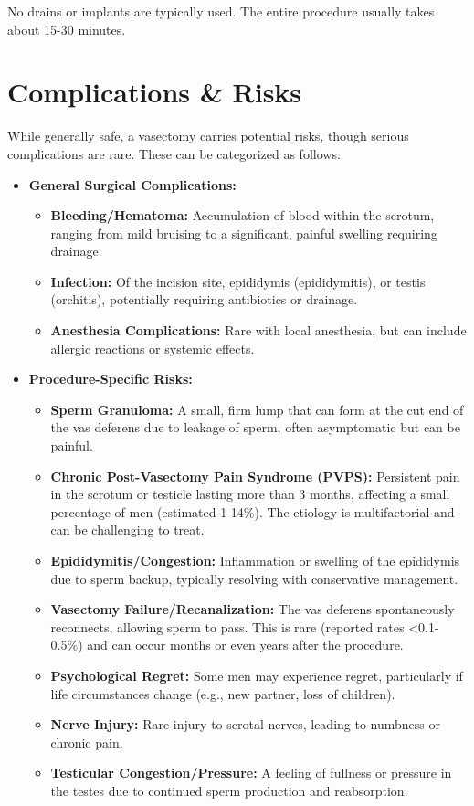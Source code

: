 No drains or implants are typically used. The entire procedure usually takes about 15-30 minutes.

\section*{Complications \& Risks}
While generally safe, a vasectomy carries potential risks, though serious complications are rare. These can be categorized as follows:

\begin{itemize}
  \item \textbf{General Surgical Complications:}
    \begin{itemize}
      \item \textbf{Bleeding/Hematoma:} Accumulation of blood within the scrotum, ranging from mild bruising to a significant, painful swelling requiring drainage.
      \item \textbf{Infection:} Of the incision site, epididymis (epididymitis), or testis (orchitis), potentially requiring antibiotics or drainage.
      \item \textbf{Anesthesia Complications:} Rare with local anesthesia, but can include allergic reactions or systemic effects.
    \end{itemize}
  
  \item \textbf{Procedure-Specific Risks:}
    \begin{itemize}
      \item \textbf{Sperm Granuloma:} A small, firm lump that can form at the cut end of the vas deferens due to leakage of sperm, often asymptomatic but can be painful.
      \item \textbf{Chronic Post-Vasectomy Pain Syndrome (PVPS):} Persistent pain in the scrotum or testicle lasting more than 3 months, affecting a small percentage of men (estimated 1-14\%). The etiology is multifactorial and can be challenging to treat.
      \item \textbf{Epididymitis/Congestion:} Inflammation or swelling of the epididymis due to sperm backup, typically resolving with conservative management.
      \item \textbf{Vasectomy Failure/Recanalization:} The vas deferens spontaneously reconnects, allowing sperm to pass. This is rare (reported rates <0.1-0.5\%) and can occur months or even years after the procedure.
      \item \textbf{Psychological Regret:} Some men may experience regret, particularly if life circumstances change (e.g., new partner, loss of children).
      \item \textbf{Nerve Injury:} Rare injury to scrotal nerves, leading to numbness or chronic pain.
      \item \textbf{Testicular Congestion/Pressure:} A feeling of fullness or pressure in the testes due to continued sperm production and reabsorption.
    \end{itemize}
\end{itemize}

